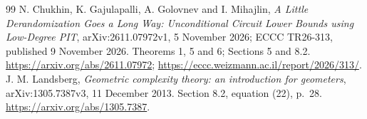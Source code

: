 \documentclass[11pt,a4paper]{article}
\begin{document}
\begin{thebibliography}{99}
 N. Chukhin, K. Gajulapalli, A. Golovnev and I. Mihajlin, \emph{A Little Derandomization Goes a Long Way: Unconditional Circuit Lower Bounds using Low-Degree PIT}, arXiv:2611.07972v1, 5 November 2026; ECCC TR26-313, published 9 November 2026. Theorems 1, 5 and 6; Sections 5 and 8.2. \url{https://arxiv.org/abs/2611.07972}; \url{https://eccc.weizmann.ac.il/report/2026/313/}.
 J. M. Landsberg, \emph{Geometric complexity theory: an introduction for geometers}, arXiv:1305.7387v3, 11 December 2013. Section 8.2, equation (22), p.~28. \url{https://arxiv.org/abs/1305.7387}.


\end{thebibliography}
\end{document}
